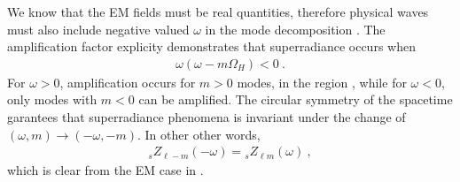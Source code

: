 We know that the EM fields must be real quantities, therefore physical waves must also include negative valued $\omega$ in the mode decomposition .
The amplification factor explicity demonstrates that superradiance occurs when
\begin{align}
    \omega(\omega-m\Omega_H)<0 ~.
\end{align}
For $\omega>0$, amplification occurs for $m>0$ modes, in the region , while for $\omega<0$, only modes with $m<0$ can be amplified.
The circular symmetry of the spacetime garantees that superradiance phenomena is invariant under the change of $(\omega,m)\to(-\omega,-m)$.
In other other words,
\begin{align}
    {}_{s}Z_{\ell-m}(-\omega) = {}_{s}Z_{\ell m}(\omega) ~,
\end{align}
which is clear from the EM case in .


\cleardoublepage